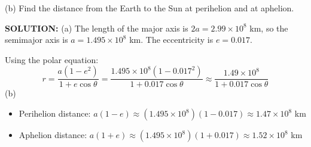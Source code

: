 \documentclass{article}
\begin{document}
(b) Find the distance from the Earth to the Sun at perihelion and at aphelion.

\textbf{SOLUTION:}
(a) The length of the major axis is $2a = 2.99 \times 10^8$ km, so the semimajor axis is $a = 1.495 \times 10^8$ km. The eccentricity is $e = 0.017$.

Using the polar equation:
\[
r = \frac{a(1 - e^2)}{1 + e \cos\theta} = \frac{1.495 \times 10^8 (1 - 0.017^2)}{1 + 0.017 \cos\theta} \approx \frac{1.49 \times 10^8}{1 + 0.017 \cos\theta}
\]
(b)
\begin{itemize}
    \item Perihelion distance: $a(1 - e) \approx (1.495 \times 10^8)(1 - 0.017) \approx 1.47 \times 10^8$ km
    \item Aphelion distance: $a(1 + e) \approx (1.495 \times 10^8)(1 + 0.017) \approx 1.52 \times 10^8$ km
\end{itemize}
\end{document}
